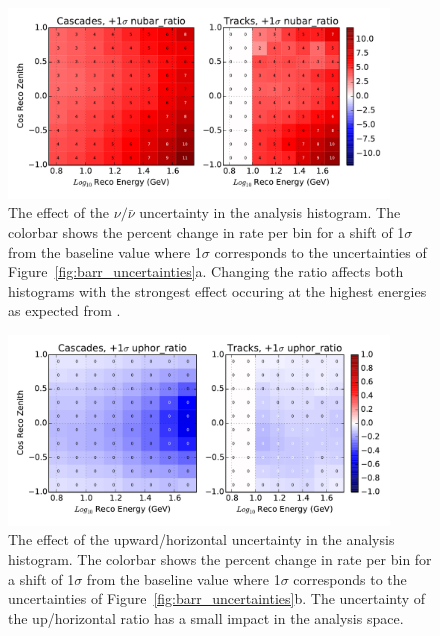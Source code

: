 \begin{figure}
\centering
\includegraphics[width=0.9\textwidth]{systematics/nubar_ratio_variation.pdf} 
\caption[Effect of $\nu/\bar{\nu}$ in the analysis histogram]{The effect of the $\nu/\bar{\nu}$ uncertainty in the analysis histogram. The colorbar shows the percent change in rate per bin for a shift of 1$\sigma$ from the baseline value where 1$\sigma$ corresponds to the uncertainties of Figure~\ref{fig:barr_uncertainties}a. Changing the ratio affects both histograms with the strongest effect occuring at the highest energies as expected from \cite{NuFlux-Barr}.}
\label{fig:systematics_nubar_ratio}
\end{figure}

\begin{figure}
\centering
\includegraphics[width=0.9\textwidth]{systematics/uphor_ratio_variation.pdf} 
\caption[Effect of Up/Horizontal in the analysis histogram]{The effect of the upward/horizontal uncertainty in the analysis histogram. The colorbar shows the percent change in rate per bin for a shift of 1$\sigma$ from the baseline value where 1$\sigma$ corresponds to the uncertainties of Figure~\ref{fig:barr_uncertainties}b. The uncertainty of the up/horizontal ratio has a small impact in the analysis space.}
\label{fig:systematics_uphor_ratio}
\end{figure}

